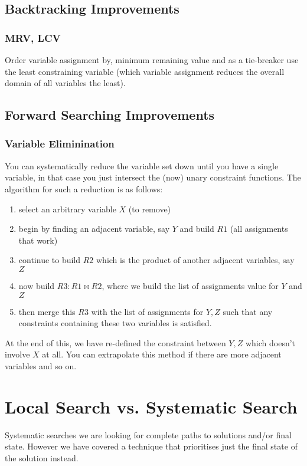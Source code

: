 \documentclass{article}
\begin{document}
\subsection*{Backtracking Improvements}
\subsubsection{MRV, LCV}
Order variable assignment by, minimum remaining value and as a tie-breaker use the least constraining variable (which variable assignment reduces the overall domain of all variables the least).

\subsection*{Forward Searching Improvements}
\subsubsection{Variable Eliminination}
You can systematically reduce the variable set down until you have a single variable, in that case you just intersect the (now) unary constraint functions. The algorithm for such a reduction is as follows:

\begin{enumerate}
	\item select an arbitrary variable $X$ (to remove)
	\item begin by finding an adjacent variable, say $Y$ and build $R1$ (all assignments that work)
	\item continue to build $R2$ which is the product of another adjacent variables, say $Z$
	\item now build $R3: R1 \bowtie R2$, where we build the list of assignments value for $Y$ and $Z$ 
	\item then merge this $R3$ with the list of assignments for $Y, Z$ such that any constraints containing these two variables is satisfied.
\end{enumerate}

At the end of this, we have re-defined the constraint between $Y, Z$ which doesn't involve $X$ at all. You can extrapolate this method if there are more adjacent variables and so on.

\section{Local Search vs. Systematic Search}
Systematic searches we are looking for complete paths to solutions and/or final state. However we have covered a technique that prioritises just the final state of the solution instead.
\end{document}
